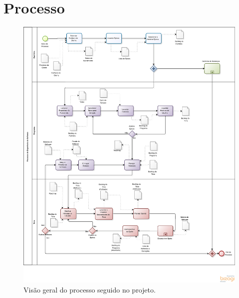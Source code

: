 \chapter[Processo]{Processo}

\begin{figure}[H]
    \centering
	\includegraphics[trim = 0mm 25mm 0mm 0mm,clip,keepaspectratio=true,scale=0.5]{figuras/processo_req.eps}
    \caption{Visão geral do processo seguido no projeto.}
    \label{fig:processo}
\end{figure}